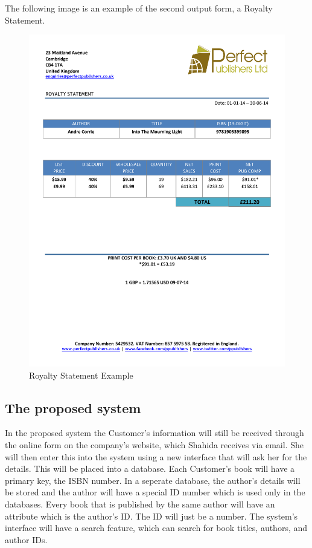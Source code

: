 The following image is an example of the second output form, a Royalty Statement.

\begin{figure}[H]
    \includegraphics[width=\textwidth]{./Analysis/Royalty_Statement_Example.pdf}
    \caption{Royalty Statement Example} \label{Royalty_Statement_Example.pdf}
\end{figure}

\subsection{The proposed system}

In the proposed system the Customer's information will still be received through the online form on the company's website, which Shahida receives via email. She will then enter this into the system using a new interface that will ask her for the details. This will be placed into a database. Each Customer's book will have a primary key, the ISBN number. In a seperate database, the author's details will be stored and the author will have a special ID number which is used only in the databases. Every book that is published by the same author will have an attribute which is the author's ID. The ID will just be a number. The system's interface will have a search feature, which can search for book titles, authors, and author IDs.

